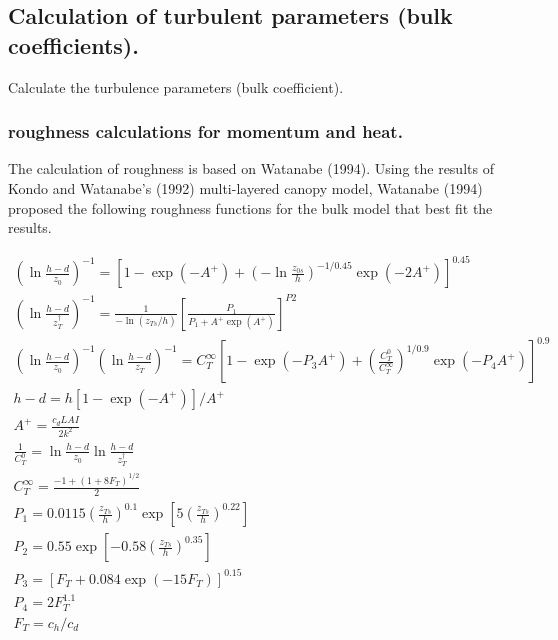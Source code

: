 \hypertarget{calculation-of-turbulent-parameters-bulk-coefficients.}{%
\subsection{Calculation of turbulent parameters (bulk
coefficients).}\label{calculation-of-turbulent-parameters-bulk-coefficients.}}

Calculate the turbulence parameters (bulk coefficient).

\hypertarget{roughness-calculations-for-momentum-and-heat.}{%
\subsubsection{roughness calculations for momentum and
heat.}\label{roughness-calculations-for-momentum-and-heat.}}

The calculation of roughness is based on Watanabe (1994). Using the
results of Kondo and Watanabe's (1992) multi-layered canopy model,
Watanabe (1994) proposed the following roughness functions for the bulk
model that best fit the results.

\begin{eqnarray}
 \left(\ln \frac{h-d}{z_0}\right)^{-1} =
 \left[ 1 - \exp( -A^+) + \left(-\ln \frac{z_{0s}}{h}\right)^{-1/0.45}
  \exp(-2A^+)\right]^{0.45} \\
 \left(\ln \frac{h-d}{z_T^{\dagger}}\right)^{-1} =
 \frac{1}{-\ln(z_{Ts}/h)} \left[ \frac{P_1}{P_1 + A^+ \exp({A^+})}\right] ^{P2} \\
 \left(\ln \frac{h-d}{z_0}\right)^{-1} \left(\ln \frac{h-d}{z_T}\right)^{-1}
 = C_T^{\infty} \left[1-\exp(-P_3 A^+)
  + \left(\frac{C_T^0}{C_T^{\infty}}\right)^{1/0.9} \exp(-P_4 A^+)\right]^{0.9} \\
 h-d = h [1-\exp(-A^+)] / {A^+} \\
 A^+ = \frac{c_d LAI}{2k^2} \\
 \frac1{C_T^0} = \ln \frac{h-d}{z_0} \ln \frac{h-d}{z_T^{\dagger}} \\
 C_T^{\infty} = \frac{-1+(1+8F_T)^{1/2}}{2} \\
 P_1 = 0.0115 \left(\frac{z_{Ts}}{h}\right)^{0.1}
  \exp\left[5 \left(\frac{z_{Ts}}{h}\right)^{0.22}\right] \\
 P_2 = 0.55 \exp\left[-0.58 \left(\frac{z_{Ts}}{h}\right)^{0.35}\right] \\
 P_3 = [F_T + 0.084 \exp(-15 F_T)]^{0.15} \\
 P_4 = 2 F_T^{1.1} \\
 F_T = c_h / c_d
\end{eqnarray}

